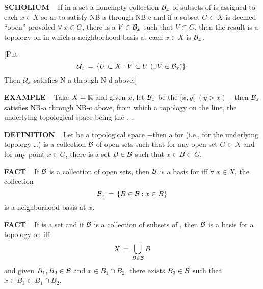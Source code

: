 \vspace{0.1cm}

\begin{x}{\small\bf SCHOLIUM} \ %
If in a set \mX a nonempty collection $\mathcal{B}_x$ of subsets of \mX is assigned to each $x \in X$ so as to satisfy 
NB-a through NB-c and if a subset $G \subset X$ is deemed ``open'' provided $\forall \ x \in G$, there is a 
$V \in \mathcal{B}_x$ such that $V \subset G$, then the result is a topology on \mX in which a neighborhood  basis 
at each $x \in X$ is $\mathcal{B}_x$.

\vspace{0.1cm}

[Put
\[
\mathcal{U}_x \hspace{0.05cm} = \hspace{0.05cm} \{U \subset X: V \subset U \ (\exists V \in \mathcal{B}_x)\}.
\]
Then $\mathcal{U}_x$ satisfies N-a through N-d above.]

\end{x}

\vspace{0.1cm}

\begin{x}{\small\bf EXAMPLE} \ %
Take $X = \mathbb{R}$ and given $x$, let $\mathcal{B}_x$ be the $[x,y[$ $(y > x)$ $-$then $\mathcal{B}_x$ satisfies NB-a through NB-c above, 
from which a topology on the line, the underlying topological space being the 
.
.
\end{x}

\vspace{0.1cm}
\begin{x}{\small\bf DEFINITION} \ %
Let \mX be a topological space $-$then a 
for \mX (i.e., for the underlying topology \ldots) is a collection $\mathcal{B}$ of open sets such that for any open set 
$G \subset X$ and for any point $x \in G$, there is a set $B \in \mathcal{B}$ such that $x \in B \subset G$.
\end{x}

\vspace{0.1cm}

\begin{x}{\small\bf FACT} \ %
If $\mathcal{B}$ is a collection of open sets, then $\mathcal{B}$ is a basis for \mX iff $\forall \ x \in X$, the collection
\[
\mathcal{B}_x \hspace{0.05cm} = \hspace{0.05cm} \{B \in \mathcal{B} : x \in B \}
\]
is a neighborhood basis at $x$.
\end{x}

\vspace{0.1cm}

\begin{x}{\small\bf FACT} \ %
If \mX is a set and if $\mathcal{B}$ is a collection of subsets of \mX, then $\mathcal{B}$ is a basis for a topology on \mX iff 
\[
X \hspace{0.05cm} = \hspace{0.05cm} \bigcup\limits_{B \in \mathcal{B}} B
\]
and given $B_1, B_2 \in \mathcal{B}$ and $x \in B_1 \cap B_2$, there exists $B_3 \in \mathcal{B}$ such that $x \in B_3 \subset B_1 \cap B_2$. 
\end{x}

